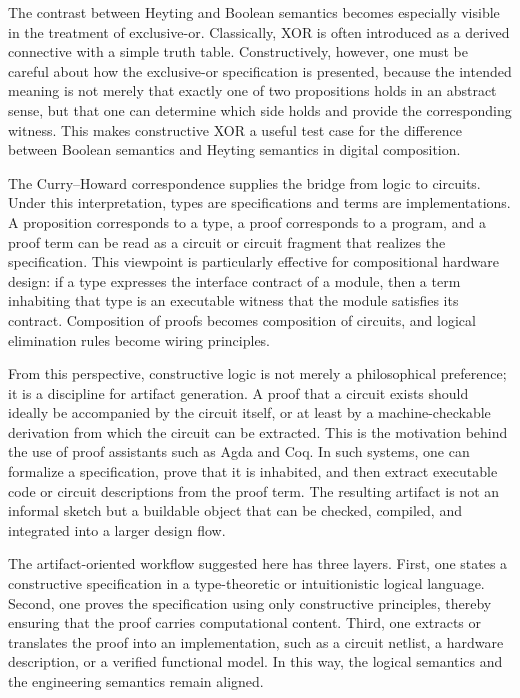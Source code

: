The contrast between Heyting and Boolean semantics becomes especially visible in the treatment of exclusive-or. Classically, XOR is often introduced as a derived connective with a simple truth table. Constructively, however, one must be careful about how the exclusive-or specification is presented, because the intended meaning is not merely that exactly one of two propositions holds in an abstract sense, but that one can determine which side holds and provide the corresponding witness. This makes constructive XOR a useful test case for the difference between Boolean semantics and Heyting semantics in digital composition.

The Curry--Howard correspondence supplies the bridge from logic to circuits. Under this interpretation, types are specifications and terms are implementations. A proposition corresponds to a type, a proof corresponds to a program, and a proof term can be read as a circuit or circuit fragment that realizes the specification. This viewpoint is particularly effective for compositional hardware design: if a type expresses the interface contract of a module, then a term inhabiting that type is an executable witness that the module satisfies its contract. Composition of proofs becomes composition of circuits, and logical elimination rules become wiring principles.

From this perspective, constructive logic is not merely a philosophical preference; it is a discipline for artifact generation. A proof that a circuit exists should ideally be accompanied by the circuit itself, or at least by a machine-checkable derivation from which the circuit can be extracted. This is the motivation behind the use of proof assistants such as Agda and Coq. In such systems, one can formalize a specification, prove that it is inhabited, and then extract executable code or circuit descriptions from the proof term. The resulting artifact is not an informal sketch but a buildable object that can be checked, compiled, and integrated into a larger design flow.

The artifact-oriented workflow suggested here has three layers. First, one states a constructive specification in a type-theoretic or intuitionistic logical language. Second, one proves the specification using only constructive principles, thereby ensuring that the proof carries computational content. Third, one extracts or translates the proof into an implementation, such as a circuit netlist, a hardware description, or a verified functional model. In this way, the logical semantics and the engineering semantics remain aligned.

